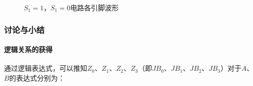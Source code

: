 \documentclass[UTF8]{ctexart}
\numberwithin{figure}{subsection}
\numberwithin{table}{subsection}
\numberwithin{equation}{subsection}
\begin{document}
\begin{figure}[H]
    \centering

    \caption{\(S_1 = 1 ，S_1 = 0\)电路各引脚波形}
    \label{11 pic}
\end{figure}

\subsubsection{讨论与小结}
\paragraph{逻辑关系的获得} 通过逻辑表达式，可以推知\(Z_0\)、\(Z_1\)、\(Z_2\)、\(Z_3\)（即\(JB_0\)、\(JB_1\)、\(JB_2\)、\(JB_3\)）对于\(A\)、\(B\)的表达式分别为：
\end{document}
